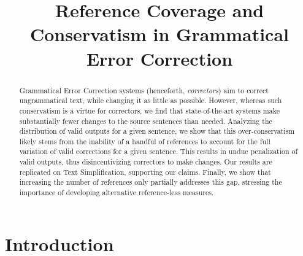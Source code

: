 \documentclass[letterpaper, 11pt]{article}
\newcommand{\lc}[1]{}
\begin{document}
\title{Reference Coverage and Conservatism in Grammatical Error Correction}
\maketitle

\begin{abstract}
  Grammatical Error Correction systems (henceforth, {\it correctors}) aim to
  correct ungrammatical text, while changing it as little as possible.
  However, whereas such conservatism is a virtue for correctors,
  we find that state-of-the-art systems make substantially fewer 
  changes to the source sentences than needed. 
  Analyzing the distribution of valid outputs for a given sentence,   
  we show that this over-conservatism likely stems from
  the inability of a handful of references to account for the full variation of valid
  corrections for a given sentence. This results in undue penalization of valid outputs,
  thus disincentivizing correctors to make changes.
  Our results are replicated on Text Simplification, supporting our claims.
  Finally, we show that increasing the number of references only partially addresses this gap,
  stressing the importance of developing alternative reference-less measures.
\end{abstract}

\section{Introduction}
\end{document}
